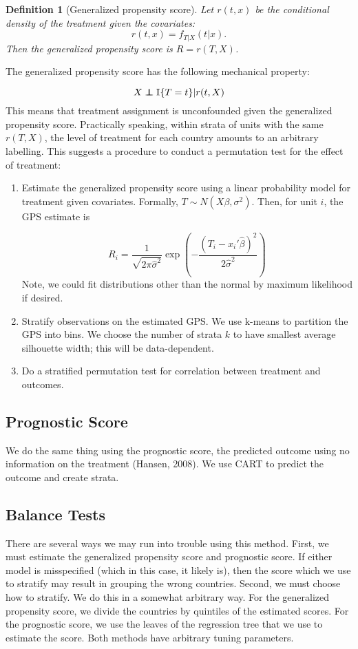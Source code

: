 \documentclass[11pt]{article}\usepackage[]{graphicx}\usepackage[]{color}
\newtheorem{definition}{Definition}
\newcommand{\ind}{\mathbb{I}} %
\newcommand{\normal}{N} %
\newcommand\independent{\protect\mathpalette{\protect\independenT}{\perp}}
\def\independenT#1#2{\mathrel{\rlap{$#1#2$}\mkern2mu{#1#2}}}
\begin{document}
\begin{definition}[Generalized propensity score]
Let $r(t, x)$ be the conditional density of the treatment given the covariates:
$$r(t, x) = f_{T | X} (t|x).$$ 
Then the generalized propensity score is $R = r(T, X)$.
\end{definition}

The generalized propensity score has the following mechanical property:

$$X \independent \ind\{T = t\} \vert r(t, X)$$
This means that treatment assignment is unconfounded given the generalized propensity score.
Practically speaking, within strata of units with the same $r(T, X)$, the level of treatment for each country amounts to an arbitrary labelling.
This suggests a procedure to conduct a permutation test for the effect of treatment:
\begin{enumerate}
\item Estimate the generalized propensity score using a linear probability model for treatment given covariates.
Formally, $T \sim \normal(X\beta, \sigma^2)$.
Then, for unit $i$, the GPS estimate is

$$ R_i = \frac{1}{\sqrt{2\pi\hat{\sigma}^2}}\exp\left(-\frac{(T_i - x_i'\hat{\beta})^2}{2\hat{\sigma}^2}\right)$$
Note, we could fit distributions other than the normal by maximum likelihood if desired. 
\item Stratify observations on the estimated GPS. 
We use k-means to partition the GPS into bins. 
We choose the number of strata $k$ to have smallest average silhouette width; this will be data-dependent.
\item Do a stratified permutation test for correlation between treatment and outcomes.
\end{enumerate}


\subsection{Prognostic Score}
We do the same thing using the prognostic score, the predicted outcome using no information on the treatment (Hansen, 2008).
We use CART to predict the outcome and create strata.

\subsection{Balance Tests}
There are several ways we may run into trouble using this method.
First, we must estimate the generalized propensity score and prognostic score.
If either model is misspecified (which in this case, it likely is), then the score which we use to stratify may result in grouping the wrong countries.
Second, we must choose how to stratify.
We do this in a somewhat arbitrary way.
For the generalized propensity score, we divide the countries by quintiles of the estimated scores.
For the prognostic score, we use the leaves of the regression tree that we use to estimate the score.
Both methods have arbitrary tuning parameters.
\end{document}
